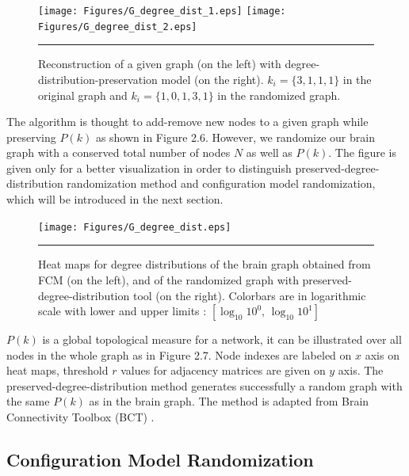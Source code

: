 \begin{figure}[htbp]
  \centering
	\texttt{[image: Figures/G\_degree\_dist\_1.eps]}  
	\texttt{[image: Figures/G\_degree\_dist\_2.eps]}    
    \rule{35em}{0.5pt}
  \caption[Degree Distribution 2D Example]{Reconstruction of a given graph (on the left) with degree-distribution-preservation model (on the right). $k_i=\{3,1,1,1\}$ in the original graph and $k_{i}=\{1,0,1,3,1\}$ in the randomized graph. }
  \label{fig:Degree Distribution Example}
\end{figure}

The algorithm is thought to add-remove new nodes to a given graph while preserving $P(k)$ as shown in Figure 2.6. However, we randomize our brain graph with a conserved total number of nodes $N$ as well as $P(k)$. The figure is given only for a better visualization in order to distinguish preserved-degree-distribution randomization method and configuration model randomization, which will be introduced in the next section.

\begin{figure}[htbp]
  \centering
	\texttt{[image: Figures/G\_degree\_dist.eps]}  
    \rule{35em}{0.5pt}
  \caption[Degree Distribution 3D Example]{Heat maps for degree distributions of the brain graph obtained from FCM (on the left), and of the randomized graph with preserved-degree-distribution tool (on the right). Colorbars are in logarithmic scale with lower and upper limits : $[\log_{10} {10}^0 , \,  \log_{10} {10}^1]$}
  \label{fig:Degree Distribution 3D Example}
\end{figure}

$P(k)$ is a global topological measure for a network, it can be illustrated over all nodes in the whole graph as in Figure 2.7. Node indexes are labeled on $x$ axis on heat maps, threshold $r$ values for adjacency matrices are given on $y$ axis. The preserved-degree-distribution method generates successfully a random graph with the same $P(k)$ as in the brain graph. The method is adapted from Brain Connectivity Toolbox (\textsc{BCT}) \citep{XYZBCT}.


\subsection{Configuration Model Randomization}

